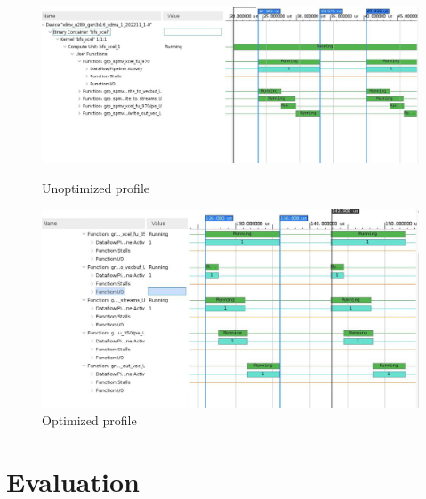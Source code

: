 \documentclass[10pt]{article}
\begin{document}
\begin{figure}[h!]
  \centering
  \begin{minipage}[b]{0.8\textwidth}
    \includegraphics[width=\textwidth]{profile_unopt.png}
    \caption{Unoptimized profile}
    \label{fig:profile_unopt}
  \end{minipage}
  \hfill
  \begin{minipage}[b]{0.8\textwidth}
    \includegraphics[width=\textwidth]{profile_opt.png}
    \caption{Optimized profile}
    \label{fig:profile_opt}
  \end{minipage}
\end{figure}

\section{Evaluation}
\end{document}
